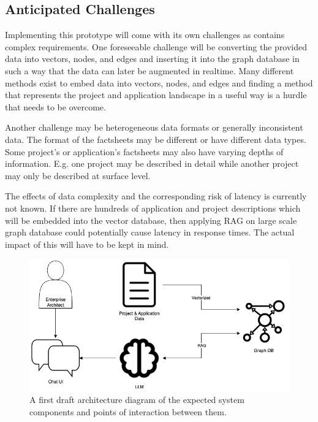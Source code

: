 \documentclass[english]{lni}
\begin{document}
\subsection{Anticipated Challenges}
Implementing this prototype will come with its own challenges as contains complex requirements. One foreseeable challenge will be converting the provided data into vectors, nodes, and edges and inserting it into the graph database in such a way that the data can later be augmented in realtime. Many different methods exist to embed data into vectors, nodes, and edges and finding a method that represents the project and application landscape in a useful way is a hurdle that needs to be overcome.\cite{grohe2020word2vec}

Another challenge may be heterogeneous data formats or generally inconsistent data. The format of the factsheets may be different or have different data types. Some project's or application's factsheets may also have varying depths of information. E.g. one project may be described in detail while another project may only be described at surface level.

The effects of data complexity and the corresponding risk of latency is currently not known. If there are hundreds of application and project descriptions which will be embedded into the vector database, then applying RAG on large scale graph database could potentially cause latency in response times. The actual impact of this will have to be kept in mind.


\begin{figure}[h]
\centering
\includegraphics[scale=0.5]{./architecture_diagram.png}
\caption{A first draft architecture diagram of the expected system components and points of interaction between them.}
\label{fig:arch_diagram}
\end{figure}
\end{document}
